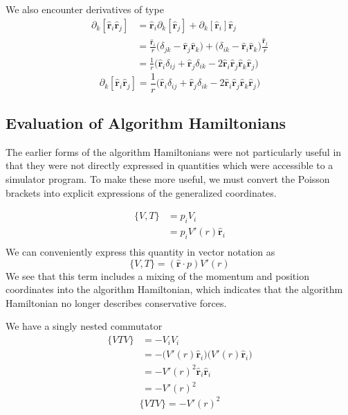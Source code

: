 \documentclass[8pt,a4paper]{article}
\begin{document}
	We also encounter derivatives of type
	\begin{align}
		\partial_k[\mathbf{\hat{r}}_i \mathbf{\hat{r}}_j] &= \mathbf{\hat{r}}_i \partial_k[\mathbf{\hat{r}}_j] + \partial_k [\mathbf{\hat{r}}_i] \mathbf{\hat{r}}_j \\
		&= \frac{\mathbf{\hat{r}}_i}{r} \Big( \delta_{jk} - \mathbf{\hat{r}}_j \mathbf{\hat{r}}_k \Big)  + \Big( \delta_{ik} - \mathbf{\hat{r}}_i \mathbf{\hat{r}}_k \Big) \frac{\mathbf{\hat{r}}_j}{r} \\
		&= \frac{1}{r}\Big(\mathbf{\hat{r}}_i \delta_{ij} + \mathbf{\hat{r}}_j \delta_{ik} - 2\mathbf{\hat{r}}_i \mathbf{\hat{r}}_j \mathbf{\hat{r}}_k \mathbf{\hat{r}}_j\Big)
	\end{align}
	\begin{equation}
		\boxed{\partial_k[\mathbf{\hat{r}}_i \mathbf{\hat{r}}_j] = \frac{1}{r}\Big(\mathbf{\hat{r}}_i \delta_{ij} + \mathbf{\hat{r}}_j \delta_{ik} - 2\mathbf{\hat{r}}_i \mathbf{\hat{r}}_j \mathbf{\hat{r}}_k \mathbf{\hat{r}}_j\Big)}
	\end{equation}
	
	\subsection{Evaluation of Algorithm Hamiltonians}
	The earlier forms of the algorithm Hamiltonians were not particularly useful in that they were not directly expressed in quantities which were accessible to a simulator program. To make these more useful, we must convert the Poisson brackets into explicit expressions of the generalized coordinates.
	
	\begin{align}
		\{V,T\} &= p_i V_i \\
		&= p_i V'(r)\mathbf{\hat{r}}_i \\
	\end{align}
	We can conveniently express this quantity in vector notation as
	\begin{equation}
		\boxed{\{V,T\} = (\mathbf{\hat{r}} \cdot p)V'(r)}
	\end{equation}
	We see that this term includes a mixing of the momentum and position coordinates into the algorithm Hamiltonian, which indicates that the algorithm Hamiltonian no longer describes conservative forces.
	
	We have a singly nested commutator
	\begin{align}
		\{VTV\} &= -V_i V_i \\
		&= -\Big(V'(r)\mathbf{\hat{r}}_i\Big) \Big(V'(r)\mathbf{\hat{r}}_i\Big) \\
		&= -V'(r)^2\mathbf{\hat{r}}_i \mathbf{\hat{r}}_i \\
		&= -V'(r)^2
	\end{align}
	\begin{equation}
		\boxed{\{VTV\} = -V'(r)^2}
	\end{equation}
	
\end{document}
